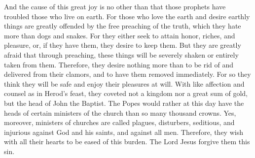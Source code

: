 And the cause of this great joy is no other than that those prophets have troubled those who live on earth. For those who love the earth and desire earthly things are greatly offended by the free preaching of the truth, which they hate more than dogs and snakes. For they either seek to attain honor, riches, and pleasure, or, if they have them, they desire to keep them. But they are greatly afraid that through preaching, these things will be severely shaken or entirely taken from them. Therefore, they desire nothing more than to be rid of and delivered from their clamors, and to have them removed immediately. For so they think they will be safe and enjoy their pleasures at will. With like affection and counsel as in Herod’s feast, they coveted not a kingdom nor a great sum of gold, but the head of John the Baptist. The Popes would rather at this day have the heads of certain ministers of the church than so many thousand crowns. Yes, moreover, ministers of churches are called plagues, disturbers, seditious, and injurious against God and his saints, and against all men. Therefore, they wish with all their hearts to be eased of this burden. The Lord Jesus forgive them this sin.
